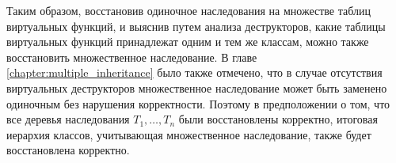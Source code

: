 Таким образом, восстановив одиночное наследования на множестве таблиц виртуальных функций, и выяснив путем анализа деструкторов, какие таблицы виртуальных функций принадлежат одним и тем же классам, можно также восстановить множественное наследование. В главе \ref{chapter:multiple_inheritance} было также отмечено, что в случае отсутствия виртуальных деструкторов множественное наследование может быть заменено одиночным без нарушения корректности. Поэтому в предположении о том, что все деревья наследования $T_1, \ldots, T_n$ были восстановлены корректно, итоговая иерархия классов, учитывающая множественное наследование, также будет восстановлена корректно.





































